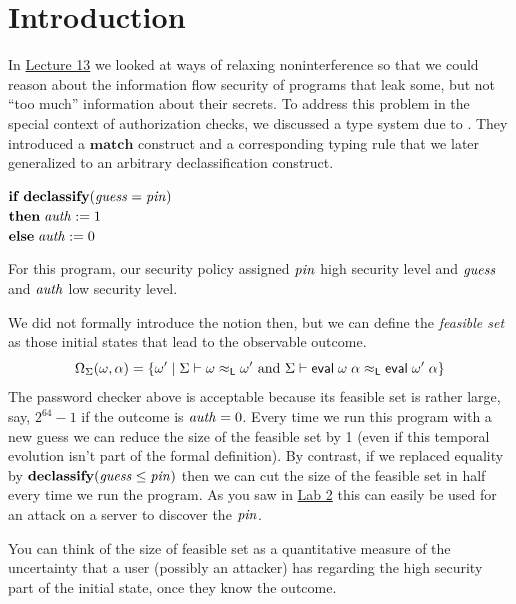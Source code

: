 \documentclass[11pt]{article}
\newcommand{\courseurl}{https://15316-cmu.github.io/2026/}
\begin{document}
\maketitle


\section{Introduction}

In \href{\courseurl/lectures/13-declassification.pdf}{Lecture 13} we looked at
ways of relaxing noninterference so that we could reason about the information
flow security of programs that leak some, but not ``too much'' information about
their secrets. To address this problem in the special context of authorization
checks, we discussed a type system due to \citet{Volpano00popl}. They introduced
a $\mathbf{match}$ construct and a corresponding typing rule that we later
generalized to an arbitrary declassification construct.
\begin{tabbing}
\quad $\mathbf{if}\; \mathbf{declassify}(\mathit{guess} = \mathit{pin})\;$ \\
\quad $\mathbf{then}\; \mathit{auth} := 1\;$ \\
\quad $\mathbf{else}\; \mathit{auth} := 0$
\end{tabbing}
For this program, our security policy assigned $\mathit{pin}$ high security level
and $\mathit{guess}$ and $\mathit{auth}$ low security level.

We did not formally introduce the notion then, but we can define the
\emph{feasible set} as those initial states that lead to the observable outcome.
\[
  \Omega_{\Sigma}(\omega, \alpha) =
  \{ \omega' \mid \Sigma \vdash \omega \approx_{\ms{L}} \omega'\ \mbox{and}\
  \Sigma \vdash \eval\; \omega\; \alpha \approx_{\ms{L}} \eval\; \omega'\; \alpha \}
\]
The password checker above is acceptable because its feasible set is rather
large, say, $2^{64} - 1$ if the outcome is $\mathit{auth} = 0$.  Every time we run
this program with a new guess we can reduce the size of the feasible set by 1
(even if this temporal evolution isn't part of the formal definition).  By
contrast, if we replaced equality by $\mathbf{declassify}(\mathit{guess} \leq \mathit{pin})$
then we can cut the size of the feasible set in half every time we run the
program.  As you saw in \href{\courseurl/labs/lab2-infoflow.pdf}{Lab 2} this
can easily be used for an attack on a server to discover the $\mathit{pin}$.

You can think of the size of feasible set as a quantitative measure of the
uncertainty that a user (possibly an attacker) has regarding the high security
part of the initial state, once they know the outcome.
\end{document}
